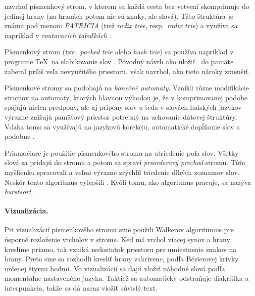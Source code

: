 \citet{patricia} navrhol písmenkový strom, v ktorom sa každá cesta bez vetvení
skomprimuje do jedinej hrany (na hranách potom nie sú znaky, ale slová).
Táto štruktúra je známa pod menom \emph{PATRICIA} (tiež \emph{radix tree},
resp.\ \emph{radix trie}) a využíva sa napríklad v \emph{routovacích tabuľkách}
\citep{radix}.

Písmenkový strom (tzv.\ \emph{packed trie} alebo \emph{hash trie}) sa používa
napríklad v programe \TeX\ na slabikovanie slov \citep{liang}.
Pôvodný návrh \citep{fredkin} ako uložiť \trie\ do pamäte zaberal
príliš veľa nevyužitého priestoru. \citet{liang} však navrhol, ako
tieto nároky zmenšiť.

Písmenkové stromy sa podobajú na \emph{konečné automaty}. 
Vznikli rôzne modifikácie stromov na automaty, ktorých hlavnou výhodou je, 
že v komprimovanej podobe spájajú nielen predpony, ale aj prípony slov 
a teda v slovách ľudských jazykov výrazne znižujú pamäťový priestor potrebný 
na uchovanie dátovej štruktúry. Vďaka tomu sa využívajú na jazykovú korekciu, 
automatické dopĺňanie slov a podobne \citep{scrabble,ca}. 

Priamočiare je použitie písmenkového stromu na utriedenie poľa slov. 
Všetky slová sa pridajú do stromu a potom sa spraví \emph{preorderový prechod} 
stromu. Túto myšlienku spracovali \citet{burstsort1} a veľmi výrazne zrýchlil 
triedenie dlhých zoznamov slov. Neskôr tento algoritmus vylepšili 
\citet{burstsort2}. Kvôli tomu, ako algoritmus pracuje, 
sa nazýva \emph{burstsort}.


\paragraph{Vizualizácia.} Pri vizualizácií písmenkového stromu sme použili 
Walkerov algoritumus pre úsporné rozloženie vrcholov v strome. 
\citep{walker} Keď má vrchol viacej synov a hrany kreslíme priamo, tak vzniká 
nedostatok priestoru pre umiestnenie znakov na hrany. Preto sme sa rozhodli 
kresliť hrany zakrivene, podľa Bézierovej krivky určenej štyrmi bodmi. 
Vo vizualizácií sa dajú vložiť náhodné slová podľa momentálne nastaveného 
jazyka. Taktiež sa automaticky odstraňuje diakritika a interpunkcia, takže 
sa dá naraz vložiť súvislý text.
